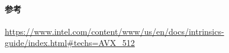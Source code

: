 \paragraph{参考}

\url{https://www.intel.com/content/www/us/en/docs/intrinsics-guide/index.html#techs=AVX_512}
